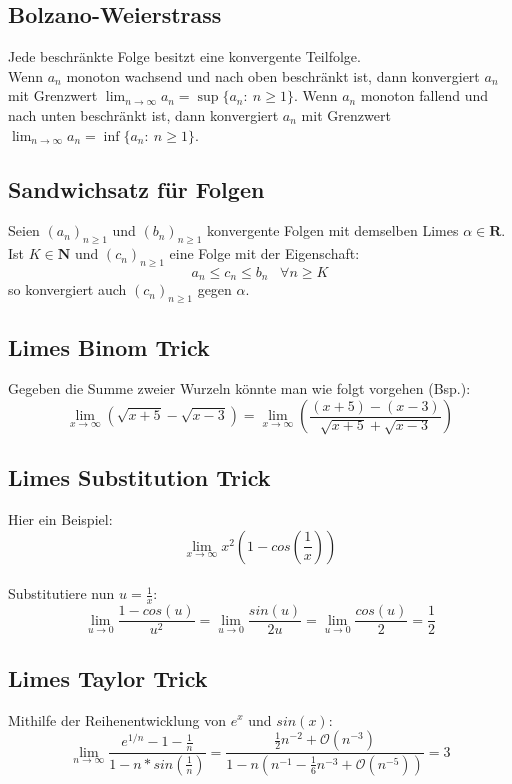 \documentclass[8pt]{article}
\def\limn{\lim_{n\to \infty}}
\begin{document}
\begin{multicols*}{3}
 \subsection{Bolzano-Weierstrass}
Jede beschränkte Folge besitzt eine konvergente Teilfolge.\\
Wenn $a_n$ monoton wachsend und nach oben beschränkt ist, dann konvergiert $a_n$ mit Grenzwert $\limn a_n = \sup \{a_n : \ n \ge 1\}$.
Wenn $a_n$ monoton fallend und nach unten beschränkt ist, dann konvergiert $a_n$ mit Grenzwert $\limn a_n = \inf \{a_n : \ n \ge 1\}$.


  \subsection {Sandwichsatz für Folgen}
Seien $(a_n)_{n \geq 1}$ und $(b_n)_{n \geq 1}$ konvergente Folgen mit demselben Limes
$\alpha \in \mathbf{R}$. Ist $K \in \mathbf{N}$ und $(c_n)_{n \geq 1}$ eine Folge
mit der Eigenschaft: $$a_n \leq c_n \leq b_n \; \; \; \forall n \geq K$$ so konvergiert
auch $(c_n)_{n \geq 1}$ gegen $\alpha$.
  \subsection{Limes Binom Trick}
Gegeben die Summe zweier Wurzeln könnte man wie folgt
vorgehen (Bsp.):
$$
  \lim_{x \rightarrow \infty} (\sqrt{x + 5} - \sqrt{x - 3}) = \lim_{x \rightarrow \infty} (\frac{(x + 5) - (x - 3)}{\sqrt{x + 5} + \sqrt{x - 3}})
$$
  \subsection{Limes Substitution Trick}
Hier ein Beispiel:
$$
  \lim_{x \rightarrow \infty} x^2 (1 - cos(\frac{1}{x}))
$$\\
Substitutiere nun $u = \frac{1}{x}$:
$$
\lim_{u \rightarrow 0} \frac{1 - cos(u)}{u^2} = \lim_{u \rightarrow 0} \frac{sin(u)}{2u} = \lim_{u \rightarrow 0} \frac{cos(u)}{2} = \frac{1}{2}
$$

  \subsection{Limes Taylor Trick}

Mithilfe der Reihenentwicklung von $e^x$ und $sin(x)$:
$$
\lim_{n \rightarrow \infty} \frac{e^{1/n} - 1 - \frac{1}{n}}{1 - n * sin(\frac{1}{n})} = \frac{\frac{1}{2}n^{-2} + \mathcal{O}(n^{-3})}{1 - n(n^{-1} - \frac{1}{6}n^{-3} + \mathcal{O}(n^{-5}))} = 3
$$


\end{multicols*}
\end{document}
